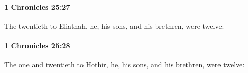		\paragraph{1 Chronicles 25:27} %
			\label{1CHRONICLES-25-27}

			The twentieth to Eliathah, he, his sons, and his brethren, were twelve:


		\paragraph{1 Chronicles 25:28} %
			\label{1CHRONICLES-25-28}

			The one and twentieth to Hothir, he, his sons, and his brethren, were twelve:


